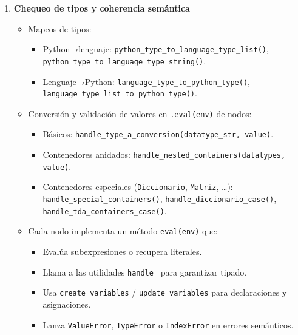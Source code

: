 \documentclass{article}
\begin{document}
\begin{enumerate}
  \item \textbf{Chequeo de tipos y coherencia semántica}  
    \begin{itemize}
      \item Mapeos de tipos:
        \begin{itemize}
          \item Python→lenguaje: \texttt{python\_type\_to\_language\_type\_list()}, \texttt{python\_type\_to\_language\_type\_string()}.
          \item Lenguaje→Python: \texttt{language\_type\_to\_python\_type()}, \texttt{language\_type\_list\_to\_python\_type()}.
        \end{itemize}
      \item Conversión y validación de valores en \texttt{.eval(env)} de nodos:
        \begin{itemize}
          \item Básicos: \texttt{handle\_type\_a\_conversion(datatype\_str, value)}.
          \item Contenedores anidados: \texttt{handle\_nested\_containers(datatypes, value)}.
          \item Contenedores especiales (\texttt{Diccionario}, \texttt{Matriz}, \ldots): \texttt{handle\_special\_containers()}, \texttt{handle\_diccionario\_case()}, \texttt{handle\_tda\_containers\_case()}.
        \end{itemize}
      \item Cada nodo implementa un método \texttt{eval(env)} que:
        \begin{itemize}
          \item Evalúa subexpresiones o recupera literales.
          \item Llama a las utilidades \texttt{handle\_\*} para garantizar tipado.
          \item Usa \texttt{create\_variables} / \texttt{update\_variables} para declaraciones y asignaciones.
          \item Lanza \texttt{ValueError}, \texttt{TypeError} o \texttt{IndexError} en errores semánticos.
        \end{itemize}
    \end{itemize}


\end{enumerate}
\end{document}
